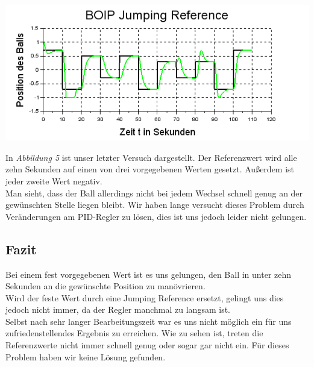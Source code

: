 \begin{center}
	\begin{minipage}{\linewidth}
	\centering
	\includegraphics[scale=0.7]{images/jumpingref.png}
	\end{minipage}
\end{center}
In \textit{Abbildung 5} ist unser letzter Versuch dargestellt. Der Referenzwert wird alle zehn Sekunden auf einen von drei vorgegebenen Werten gesetzt. Außerdem ist jeder zweite Wert negativ.\\
Man sieht, dass der Ball allerdings nicht bei jedem Wechsel schnell genug an der gewünschten Stelle liegen bleibt. Wir haben lange versucht dieses Problem durch Veränderungen am PID-Regler zu lösen, dies ist uns jedoch leider nicht gelungen.


\subsection{Fazit}
Bei einem fest vorgegebenen Wert ist es uns gelungen, den Ball in unter zehn Sekunden an die gewünschte Position zu manövrieren. \\
Wird der feste Wert durch eine Jumping Reference ersetzt, gelingt uns dies jedoch nicht immer, da der Regler manchmal zu langsam ist.\\
Selbst nach sehr langer Bearbeitungszeit war es uns nicht möglich ein für uns zufriedenstellendes Ergebnis zu erreichen. Wie zu sehen ist, treten die Referenzwerte nicht immer schnell genug oder sogar gar nicht ein. Für dieses Problem haben wir keine Lösung gefunden.